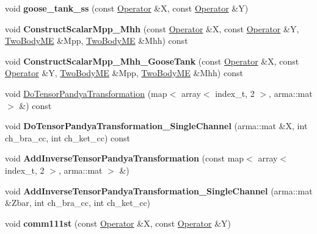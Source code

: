 \begin{DoxyCompactItemize}
\item 
void {\bfseries goose\+\_\+tank\+\_\+ss} (const \hyperlink{classOperator}{Operator} \&X, const \hyperlink{classOperator}{Operator} \&Y)\hypertarget{classOperator_af3bb83c85644485bd2f1a3c278a4f7e1}{}\label{classOperator_af3bb83c85644485bd2f1a3c278a4f7e1}

\item 
void {\bfseries Construct\+Scalar\+Mpp\+\_\+\+Mhh} (const \hyperlink{classOperator}{Operator} \&X, const \hyperlink{classOperator}{Operator} \&Y, \hyperlink{classTwoBodyME}{Two\+Body\+ME} \&Mpp, \hyperlink{classTwoBodyME}{Two\+Body\+ME} \&Mhh) const \hypertarget{classOperator_a48c289cef2f98a32300e7c167173869b}{}\label{classOperator_a48c289cef2f98a32300e7c167173869b}

\item 
void {\bfseries Construct\+Scalar\+Mpp\+\_\+\+Mhh\+\_\+\+Goose\+Tank} (const \hyperlink{classOperator}{Operator} \&X, const \hyperlink{classOperator}{Operator} \&Y, \hyperlink{classTwoBodyME}{Two\+Body\+ME} \&Mpp, \hyperlink{classTwoBodyME}{Two\+Body\+ME} \&Mhh) const \hypertarget{classOperator_adf4d5bec171c405c7d6f0b17fbac4b7f}{}\label{classOperator_adf4d5bec171c405c7d6f0b17fbac4b7f}

\item 
void \hyperlink{classOperator_ad7c6a9d515a2577985358b43cf6a365e}{Do\+Tensor\+Pandya\+Transformation} (map$<$ array$<$ index\+\_\+t, 2 $>$, arma\+::mat $>$ \&) const 
\item 
void {\bfseries Do\+Tensor\+Pandya\+Transformation\+\_\+\+Single\+Channel} (arma\+::mat \&X, int ch\+\_\+bra\+\_\+cc, int ch\+\_\+ket\+\_\+cc) const \hypertarget{classOperator_ac665c6e896f34819f21844b3ee94218c}{}\label{classOperator_ac665c6e896f34819f21844b3ee94218c}

\item 
void {\bfseries Add\+Inverse\+Tensor\+Pandya\+Transformation} (const map$<$ array$<$ index\+\_\+t, 2 $>$, arma\+::mat $>$ \&)\hypertarget{classOperator_a0ef3dde3c991e9fbc4571b20e856e7d1}{}\label{classOperator_a0ef3dde3c991e9fbc4571b20e856e7d1}

\item 
void {\bfseries Add\+Inverse\+Tensor\+Pandya\+Transformation\+\_\+\+Single\+Channel} (arma\+::mat \&Zbar, int ch\+\_\+bra\+\_\+cc, int ch\+\_\+ket\+\_\+cc)\hypertarget{classOperator_a5d90f7e7e9e9bcfe814465ee7a271b60}{}\label{classOperator_a5d90f7e7e9e9bcfe814465ee7a271b60}

\item 
void {\bfseries comm111st} (const \hyperlink{classOperator}{Operator} \&X, const \hyperlink{classOperator}{Operator} \&Y)\hypertarget{classOperator_a9e365e6c594c517083fe6af1eb5907b2}{}\label{classOperator_a9e365e6c594c517083fe6af1eb5907b2}


\end{DoxyCompactItemize}
